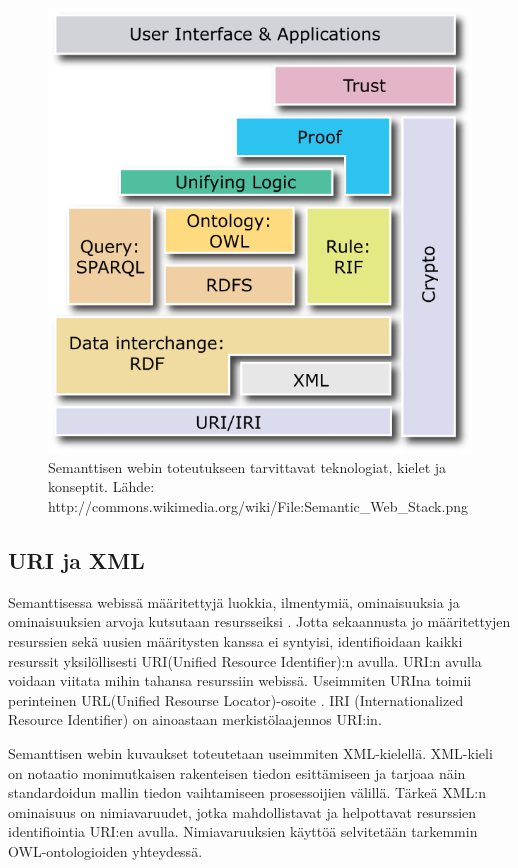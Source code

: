 \documentclass[finnish]{tktltiki2}
\theoremstyle{definition}
\theoremstyle{remark}
\begin{document}
\begin{figure}[h]
 \centering
 \includegraphics[scale=0.50]{stack.png}
 \caption{Semanttisen webin toteutukseen tarvittavat teknologiat, kielet ja konseptit. Lähde: http://commons.wikimedia.org/wiki/File:Semantic\_Web\_Stack.png }
 \label{stack}
\end{figure}
 
\subsection{URI ja XML}

Semanttisessa webissä määritettyjä luokkia, ilmentymiä, ominaisuuksia ja ominaisuuksien
arvoja kutsutaan resursseiksi \cite{BHL01}. Jotta sekaannusta jo määritettyjen resurssien
sekä uusien määritysten kanssa ei syntyisi, identifioidaan kaikki resurssit
yksilöllisesti URI(Unified Resource Identifier):n avulla.
URI:n avulla voidaan viitata mihin tahansa resurssiin webissä. Useimmiten
URIna toimii perinteinen URL(Unified Resourse Locator)-osoite \cite{BHL01}. IRI
(Internationalized Resource Identifier) on ainoastaan merkistölaajennos URI:in.
 
 Semanttisen webin kuvaukset toteutetaan useimmiten XML-kielellä.
XML-kieli on notaatio monimutkaisen rakenteisen tiedon esittämiseen ja
tarjoaa näin standardoidun mallin tiedon vaihtamiseen prosessoijien välillä.
Tärkeä XML:n ominaisuus on nimiavaruudet, jotka mahdollistavat ja helpottavat resurssien
identifiointia URI:en avulla. Nimiavaruuksien käyttöä selvitetään tarkemmin
OWL-ontologioiden yhteydessä. 
\end{document}
